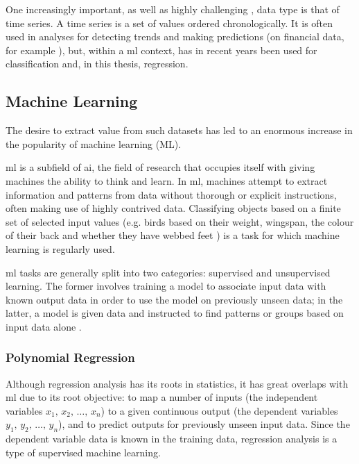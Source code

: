 One increasingly important, as well as highly challenging \cite[]{yang_10_2006}, data type is that of time series. A time series is a set of values ordered chronologically. It is often used in analyses for detecting trends and making predictions (on financial data, for example \cite[]{krollner_financial_2010}), but, within a \ac{ml} context, has in recent years been used for classification \cite[]{dau_ucr_2019,ismail_fawaz_deep_2019} and, in this thesis, regression.

\subsection{Machine Learning}
The desire to extract value from such datasets has led to an enormous increase in the popularity of machine learning (ML).

\ac{ml} is a subfield of \ac{ai}, the field of research that occupies itself with giving machines the ability to think and learn. In \ac{ml}, machines attempt to extract information and patterns from data without thorough or explicit instructions, often making use of highly contrived data. Classifying objects based on a finite set of selected input values (e.g. birds based on their weight, wingspan, the colour of their back and whether they have webbed feet \cite[]{harrington_machine_2012}) is a task for which machine learning is regularly used.

\ac{ml} tasks are generally split into two categories: supervised and unsupervised learning. The former involves training a model to associate input data with known output data in order to use the model on previously unseen data; in the latter, a model is given data and instructed to find patterns or groups based on input data alone \cite[]{goodfellow_deep_2016,kelleher_fundamentals_2015}.

\subsubsection{Polynomial Regression} \label{sec:polyreg}
Although regression analysis has its roots in statistics, it has great overlaps with \ac{ml} due to its root objective: to map a number of inputs (the independent variables \(x_1,\,x_2,\,\ldots,\,x_n\)) to a given continuous output (the dependent variables \(y_1,\,y_2,\,\ldots,\,y_n\)), and to predict outputs for previously unseen input data. Since the dependent variable data is known in the training data, regression analysis is a type of supervised machine learning.

